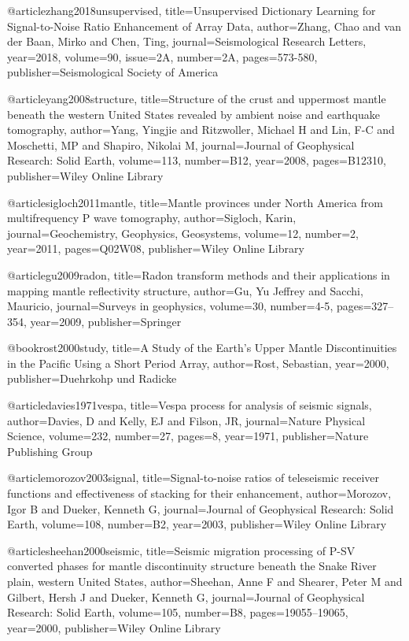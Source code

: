 @article{zhang2018unsupervised,
  title={Unsupervised Dictionary Learning for Signal-to-Noise Ratio Enhancement of Array Data},
  author={Zhang, Chao and van der Baan, Mirko and Chen, Ting},
  journal={Seismological Research Letters},
  year={2018},
  volume=90,
  issue=2A,
  number=2A,  
  pages={573-580},
  publisher={Seismological Society of America}
}

@article{yang2008structure,
  title={Structure of the crust and uppermost mantle beneath the western United States revealed by ambient noise and earthquake tomography},
  author={Yang, Yingjie and Ritzwoller, Michael H and Lin, F-C and Moschetti, MP and Shapiro, Nikolai M},
  journal={Journal of Geophysical Research: Solid Earth},
  volume={113},
  number={B12},
  year={2008},
  pages={B12310},
  publisher={Wiley Online Library}
}

@article{sigloch2011mantle,
  title={Mantle provinces under North America from multifrequency P wave tomography},
  author={Sigloch, Karin},
  journal={Geochemistry, Geophysics, Geosystems},
  volume={12},
  number={2},
  year={2011},
  pages={Q02W08},
  publisher={Wiley Online Library}
}





@article{gu2009radon,
  title={Radon transform methods and their applications in mapping mantle reflectivity structure},
  author={Gu, Yu Jeffrey and Sacchi, Mauricio},
  journal={Surveys in geophysics},
  volume={30},
  number={4-5},
  pages={327--354},
  year={2009},
  publisher={Springer}
}


@book{rost2000study,
  title={A Study of the Earth's Upper Mantle Discontinuities in the Pacific Using a Short Period Array},
  author={Rost, Sebastian},
  year={2000},
  publisher={Duehrkohp und Radicke}
}

@article{davies1971vespa,
  title={Vespa process for analysis of seismic signals},
  author={Davies, D and Kelly, EJ and Filson, JR},
  journal={Nature Physical Science},
  volume={232},
  number={27},
  pages={8},
  year={1971},
  publisher={Nature Publishing Group}
}


@article{morozov2003signal,
  title={Signal-to-noise ratios of teleseismic receiver functions and effectiveness of stacking for their enhancement},
  author={Morozov, Igor B and Dueker, Kenneth G},
  journal={Journal of Geophysical Research: Solid Earth},
  volume={108},
  number={B2},
  year={2003},
  publisher={Wiley Online Library}
}

@article{sheehan2000seismic,
  title={Seismic migration processing of P-SV converted phases for mantle discontinuity structure beneath the Snake River plain, western United States},
  author={Sheehan, Anne F and Shearer, Peter M and Gilbert, Hersh J and Dueker, Kenneth G},
  journal={Journal of Geophysical Research: Solid Earth},
  volume={105},
  number={B8},
  pages={19055--19065},
  year={2000},
  publisher={Wiley Online Library}
}


